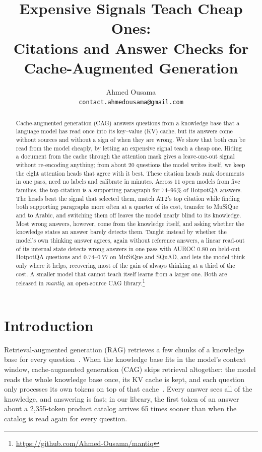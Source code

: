 \documentclass[11pt]{article}
\title{Expensive Signals Teach Cheap Ones:\\Citations and Answer Checks for Cache-Augmented Generation}
\author{Ahmed Ousama\\\texttt{contact.ahmedousama@gmail.com}}
\date{}
\begin{document}
\maketitle

\begin{abstract}
Cache-augmented generation (CAG) answers questions from a knowledge base that a language model has read once into its key--value (KV) cache, but its answers come without sources and without a sign of when they are wrong. We show that both can be read from the model cheaply, by letting an expensive signal teach a cheap one. Hiding a document from the cache through the attention mask gives a leave-one-out signal without re-encoding anything; from about 20 questions the model writes itself, we keep the eight attention heads that agree with it best. These citation heads rank documents in one pass, need no labels and calibrate in minutes. Across 11 open models from five families, the top citation is a supporting paragraph for 74--96\% of HotpotQA answers. The heads beat the signal that selected them, match AT2's top citation while finding both supporting paragraphs more often at a quarter of its cost, transfer to MuSiQue and to Arabic, and switching them off leaves the model nearly blind to its knowledge. Most wrong answers, however, come from the knowledge itself, and asking whether the knowledge states an answer barely detects them. Taught instead by whether the model's own thinking answer agrees, again without reference answers, a linear read-out of its internal state detects wrong answers in one pass with AUROC 0.80 on held-out HotpotQA questions and 0.74--0.77 on MuSiQue and SQuAD, and lets the model think only where it helps, recovering most of the gain of always thinking at a third of the cost. A smaller model that cannot teach itself learns from a larger one. Both are released in \emph{mantiq}, an open-source CAG library.\footnote{\url{https://github.com/Ahmed-Ousama/mantiq}}
\end{abstract}

\section{Introduction}
\label{sec:intro}

Retrieval-augmented generation (RAG) retrieves a few chunks of a knowledge base for every question~\citep{lewis2020rag}. When the knowledge base fits in the model's context window, cache-augmented generation (CAG) skips retrieval altogether: the model reads the whole knowledge base once, its KV cache is kept, and each question only processes its own tokens on top of that cache~\citep{chan2024dontdorag}. Every answer sees all of the knowledge, and answering is fast; in our library, the first token of an answer about a 2{,}355-token product catalog arrives 65 times sooner than when the catalog is read again for every question.
\end{document}
